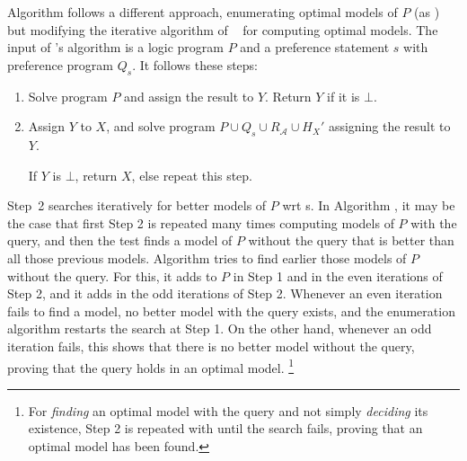 Algorithm  follows a different approach, enumerating optimal models of $P$ (as ) 
but modifying the iterative algorithm of \asprin\ \cite{brderosc15a} for computing optimal models.
%
The input of \asprin's algorithm is a logic program $P$ and a preference statement $s$ with preference program $Q_s$.
%
It follows these steps:
\begin{enumerate}
\item
Solve program $P$ and assign the result to $Y$. Return $Y$ if it is $\bot$.
\item
Assign $Y$ to $X$, and solve program $P \cup Q_s \cup R_\mathcal{A} \cup H_{X}'$ assigning the result to $Y$.
\par
If $Y$ is $\bot$, return $X$, else repeat this step.
\end{enumerate}
%
Step~2 searches iteratively for better models of $P$ wrt s.
%
In Algorithm , it may be the case that first Step 2 is repeated many times computing models of $P$ with the query, 
and then the test finds a model of $P$ without the query that is better than all those previous models.
%
Algorithm  tries to find earlier those models of $P$ without the query.
%
For this, it adds  to $P$ in Step 1 and in the even iterations of Step 2, 
and it adds  in the odd iterations of Step 2.
%
Whenever an even iteration fails to find a model, no better model with the query exists, 
and the enumeration algorithm restarts the search at Step 1.
%
On the other hand, whenever an odd iteration fails, 
this shows that there is no better model without the query, 
proving that the query holds in an optimal model.%
\footnote{For \emph{finding} an optimal model with the query and not simply \emph{deciding} its existence, 
Step 2 is repeated with  until the search fails, proving that an optimal model has been found.}
%
%


